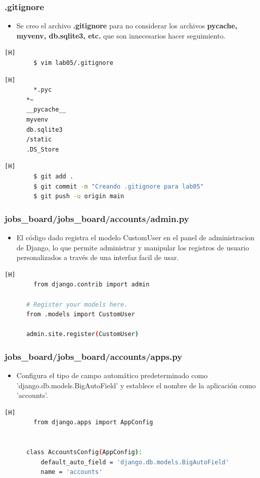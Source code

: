 \documentclass{article}
\begin{document}
    \subsubsection{.gitignore}
    \begin{itemize}	
		\item Se creo el archivo \textbf{.gitignore} para no considerar los archivos \textbf{pycache, myvenv, db.sqlite3, etc.} que son innecesarios hacer seguimiento.
	\end{itemize}
	\begin{lstlisting}[language=bash,caption={Creando .gitignore}][H]
		$ vim lab05/.gitignore
	\end{lstlisting}
	\begin{lstlisting}[language=bash,caption={lab05/.gitignore}][H]
		*.pyc
      *~
      __pycache__
      myvenv
      db.sqlite3
      /static
      .DS_Store
	\end{lstlisting}
	\begin{lstlisting}[language=bash,caption={Commit de .gitignore}][H]
		$ git add .
		$ git commit -m "Creando .gitignore para lab05"			
		$ git push -u origin main
	\end{lstlisting}
    \subsubsection{jobs\_board/jobs\_board/accounts/admin.py}
    \begin{itemize}
        \item El código dado registra el modelo CustomUser en el panel de administracion de Django, lo que permite administrar y manipular los registros de usuario personalizados a través de una interfaz facil de usar.
    \end{itemize}
    \begin{lstlisting}[language=bash,caption={admin.py}][H]
		from django.contrib import admin

      # Register your models here.
      from .models import CustomUser

      admin.site.register(CustomUser)
	\end{lstlisting}
    \subsubsection{jobs\_board/jobs\_board/accounts/apps.py}
    \begin{itemize}
        \item Configura el tipo de campo automático predeterminado como 'django.db.models.BigAutoField' y establece el nombre de la aplicación como 'accounts'.
    \end{itemize}
    \begin{lstlisting}[language=bash,caption={apps.py}][H]
		from django.apps import AppConfig


      class AccountsConfig(AppConfig):
          default_auto_field = 'django.db.models.BigAutoField'
          name = 'accounts'
	\end{lstlisting}
\end{document}
